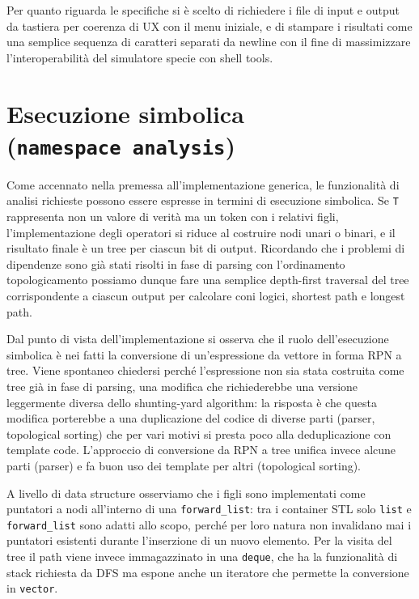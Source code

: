 \documentclass[12pt]{article}
\begin{document}
Per quanto riguarda le specifiche si è scelto di richiedere i file di
input e output da tastiera per coerenza di UX con il menu iniziale, e di
stampare i risultati come una semplice sequenza di caratteri separati da
newline con il fine di massimizzare l'interoperabilità del simulatore
specie con shell tools.

\section{Esecuzione simbolica (\texttt{namespace\ analysis})}

Come accennato nella premessa all'implementazione generica, le
funzionalità di analisi richieste possono essere espresse in termini di
esecuzione simbolica. Se \texttt{T} rappresenta non un valore di verità
ma un token con i relativi figli, l'implementazione degli operatori si
riduce al costruire nodi unari o binari, e il risultato finale è un tree
per ciascun bit di output. Ricordando che i problemi di dipendenze sono
già stati risolti in fase di parsing con l'ordinamento topologicamento
possiamo dunque fare una semplice depth-first traversal del tree
corrispondente a ciascun output per calcolare coni logici, shortest path
e longest path.

Dal punto di vista dell'implementazione si osserva che il ruolo
dell'esecuzione simbolica è nei fatti la conversione di un'espressione
da vettore in forma RPN a tree. Viene spontaneo chiedersi perché
l'espressione non sia stata costruita come tree già in fase di parsing,
una modifica che richiederebbe una versione leggermente diversa dello
shunting-yard algorithm: la risposta è che questa modifica porterebbe a
una duplicazione del codice di diverse parti (parser, topological
sorting) che per vari motivi si presta poco alla deduplicazione con
template code. L'approccio di conversione da RPN a tree unifica invece
alcune parti (parser) e fa buon uso dei template per altri (topological
sorting).

A livello di data structure osserviamo che i figli sono implementati
come puntatori a nodi all'interno di una \texttt{forward\_list}: tra i
container STL solo \texttt{list} e \texttt{forward\_list} sono adatti
allo scopo, perché per loro natura non invalidano mai i puntatori
esistenti durante l'inserzione di un nuovo elemento. Per la visita del
tree il path viene invece immagazzinato in una \texttt{deque}, che ha la
funzionalità di stack richiesta da DFS ma espone anche un iteratore che
permette la conversione in \texttt{vector}.
\end{document}
